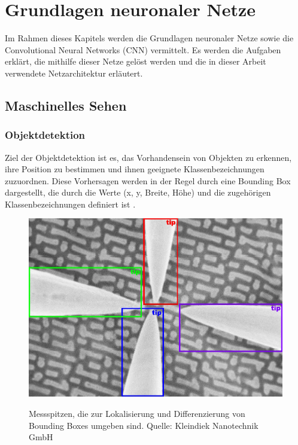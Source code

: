 \clearpage
\chapter{Grundlagen neuronaler Netze}
Im Rahmen dieses Kapitels werden die Grundlagen neuronaler Netze sowie die Convolutional Neural Networks (CNN) vermittelt.
Es werden die Aufgaben erklärt, die mithilfe dieser Netze gelöst werden und die in dieser Arbeit verwendete Netzarchitektur erläutert.

\section{Maschinelles Sehen}
\subsection{Objektdetektion}
Ziel der Objektdetektion ist es, das Vorhandensein von Objekten zu erkennen, ihre Position zu bestimmen und ihnen geeignete Klassenbezeichnungen zuzuordnen.
Diese Vorhersagen werden in der Regel durch eine Bounding Box dargestellt, die durch die Werte (x, y, Breite, Höhe) und die zugehörigen Klassenbezeichnungen definiert ist \cite{paperswithcode-compvis}.

\begin{figure}[h]
    \centering
    \includegraphics[width=.6\textwidth, angle=0]{img/22 nm_objectdetection.png}
    \label{fig:obdet}
    \caption{Messspitzen, die zur Lokalisierung und Differenzierung von Bounding Boxes umgeben sind. Quelle: Kleindiek Nanotechnik GmbH}
\end{figure}
